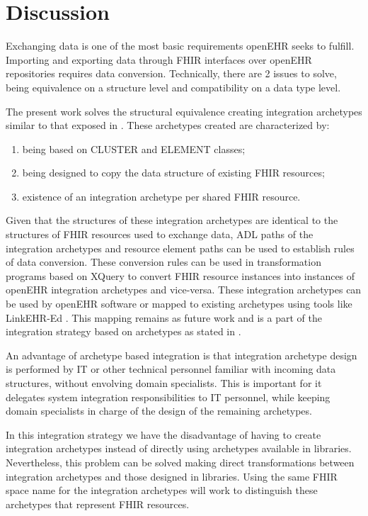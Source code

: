 \section{Discussion}

Exchanging data is one of the most basic requirements openEHR seeks to fulfill. Importing and exporting data through FHIR interfaces over openEHR repositories requires data conversion. Technically, there are 2 issues to solve, being equivalence on a structure level and compatibility on a data type level.

The present work solves the structural equivalence creating integration archetypes similar to that exposed in \cite{openEHRArchitecture}. These archetypes created are characterized by:

\begin{enumerate}
  \item being based on CLUSTER and ELEMENT classes;
  \item being designed to copy the data structure of existing FHIR resources;
  \item existence of an integration archetype per shared FHIR resource.
\end{enumerate}

Given that the structures of these integration archetypes are identical to the structures of FHIR resources used to exchange data, ADL paths of the integration archetypes and resource element paths can be used to establish rules of data conversion. These conversion rules can be used in transformation programs based on XQuery to convert FHIR resource instances into instances of openEHR integration archetypes and vice-versa. These integration archetypes can be used by openEHR software or mapped to existing archetypes using tools like LinkEHR-Ed \cite{Maldonado09}. This mapping remains as future work and is a part of the integration strategy based on archetypes as stated in \cite{openEHRIntegration}.

An advantage of archetype based integration is that integration archetype design is performed by IT or other technical personnel familiar with incoming data structures, without envolving domain specialists. This is important for it delegates system integration responsibilities to IT personnel, while keeping domain specialists in charge of the design of the remaining archetypes.

In this integration strategy we have the disadvantage of having to create integration archetypes instead of directly using archetypes available in libraries. Nevertheless, this problem can be solved making direct transformations between integration archetypes and those designed in libraries. Using the same FHIR space name for the integration archetypes will work to distinguish these archetypes that represent FHIR resources.

